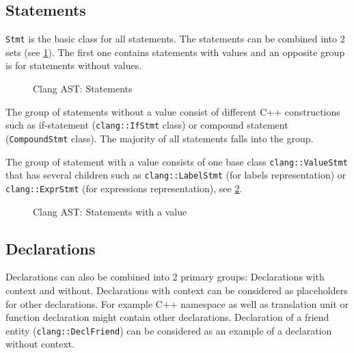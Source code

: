 \subsection{Statements}
\texttt{Stmt} is the basic class for all statements. The statements can
be combined into 2 sets (see \cref{fig:ast_stmt}). The first one contains
statements with values and an opposite group is for statements without values.
\begin{figure}[H]
  \caption{Clang AST: Statements}  
  \label{fig:ast_stmt}
\end{figure}

The group of statements without a value consist of different C++ constructions
such as if-statement (\texttt{clang::IfStmt} class) or compound statement
(\texttt{CompoundStmt} class). The majority of all statements falls
into the group.

The group of statement with a value consists of one base class
\texttt{clang::ValueStmt} that has several children such as
\texttt{clang::LabelStmt} (for labels representation) or
\texttt{clang::ExprStmt} (for expressions representation), see
\cref{fig:ast_valuestmt}.

\begin{figure}
  \caption{Clang AST: Statements with a value}  
  \label{fig:ast_valuestmt}
\end{figure}

\subsection{Declarations}
Declarations can also be combined into 2 primary groups: Declarations with
context and without. Declarations with context can be considered as placeholders
for other declarations. For example C++ namespace as well as translation unit or
function declaration might contain other declarations. Declaration of a friend
entity (\texttt{clang::DeclFriend}) can 
be considered as an example of a declaration without context.

